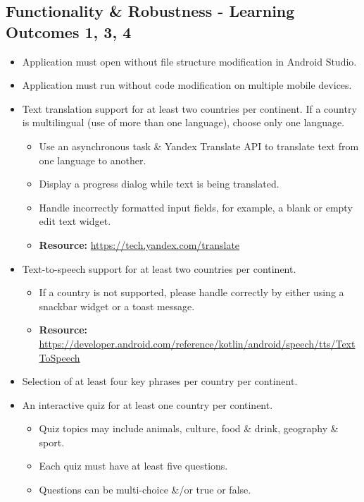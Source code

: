 \documentclass{article}
\begin{document}
\subsection*{Functionality \& Robustness - Learning Outcomes 1, 3, 4}
\begin{itemize}
    \item Application must open without file structure modification in Android Studio.
    \item Application must run without code modification on multiple mobile devices.
    \item Text translation support for at least two countries per continent. If a country is multilingual (use of more than one language), choose only one language. 
    \begin{itemize}
        \item Use an asynchronous task \& Yandex Translate API to translate text from one language to another.
        \item Display a progress dialog while text is being translated. 
        \item Handle incorrectly formatted input fields, for example, a blank or empty edit text widget.
        \item \textbf{Resource:} \footnotesize\href{https://tech.yandex.com/translate}{https://tech.yandex.com/translate}
    \end{itemize}
    \item Text-to-speech support for at least two countries per continent. 
    \begin{itemize}
        \item If a country is not supported, please handle correctly by either using a snackbar widget or a toast message.
        \item \textbf{Resource:} \footnotesize\href{https://developer.android.com/reference/kotlin/android/speech/tts/TextToSpeech}{https://developer.android.com/reference/kotlin/android/speech/tts/TextToSpeech} 
    \end{itemize}
    \item Selection of at least four key phrases per country per continent.
    \item An interactive quiz for at least one country per continent.
    \begin{itemize}
        \item Quiz topics may include animals, culture, food \& drink, geography \& sport.
        \item Each quiz must have at least five questions.
        \item Questions can be multi-choice \&/or true or false.

\end{itemize}
\end{itemize}
\end{document}
